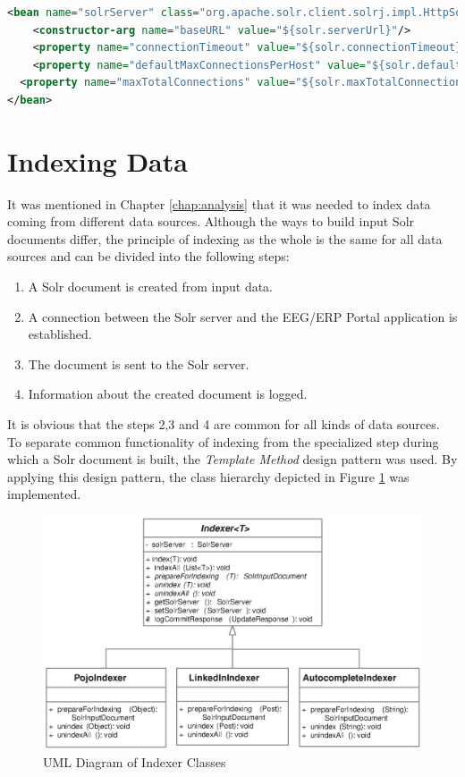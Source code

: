 \begin{lstlisting}[language=XML, caption={Configuration of the Solr Server Bean.}, label={listing:solrBeanConf}]
<bean name="solrServer" class="org.apache.solr.client.solrj.impl.HttpSolrServer">
	<constructor-arg name="baseURL" value="${solr.serverUrl}"/>
	<property name="connectionTimeout" value="${solr.connectionTimeout}"/>
	<property name="defaultMaxConnectionsPerHost" value="${solr.defaultMaxConnectionsPerHost}"/>
  <property name="maxTotalConnections" value="${solr.maxTotalConnections}"/>
</bean>
\end{lstlisting}

\section{Indexing Data}

It was mentioned in Chapter \ref{chap:analysis} that it was needed to index data coming from different data sources.
Although the ways to build input Solr documents differ, the principle of indexing as the whole is the same for all data sources and can be divided into the following steps:

\begin{enumerate}
	\item A Solr document is created from input data.
	\item A connection between the Solr server and the EEG/ERP Portal application is established.
	\item The document is sent to the Solr server.
	\item Information about the created document is logged.
\end{enumerate}

It is obvious that the steps 2,3 and 4 are common for all kinds of data sources.
To separate common functionality of indexing from the specialized step during which a Solr document is built, the \textit{Template Method} design pattern was used.
By applying this design pattern, the class hierarchy depicted in Figure \ref{fig:indexersUml} was implemented.

\begin{figure}[h]
	\centering
		\includegraphics{figures/indexersUml.eps}
	\caption{UML Diagram of Indexer Classes}
	\label{fig:indexersUml}
\end{figure}

